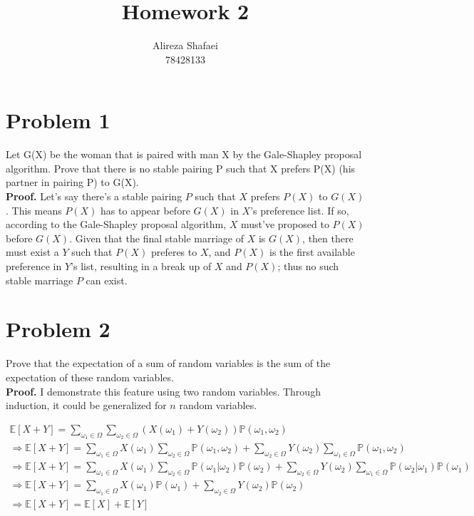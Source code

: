 \documentclass[11pt]{article} %
\title{Homework 2}
\author{Alireza Shafaei\\78428133}
\begin{document}
\maketitle

\section*{Problem 1}
Let G(X) be the woman that is paired with man X by the Gale-Shapley proposal algorithm. Prove that there is no stable pairing P such that X prefers P(X) (his partner in pairing P) to G(X).\\
\textbf{Proof.}
Let's say there's a stable pairing $P$ such that $X$ prefers $P(X)$ to $G(X)$. This means $P(X)$ has to appear before $G(X)$ in $X$'s preference list. If so, according to the Gale-Shapley proposal algorithm, $X$ must've proposed to $P(X)$ before $G(X)$. Given that the final stable marriage of $X$ is $G(X)$, then there must exist a $Y$ such that $P(X)$ preferes to $X$, and $P(X)$ is the first available preference in $Y$'s list, resulting in a break up of $X$ and $P(X)$; thus no such stable marriage $P$ can exist.

\section*{Problem 2}
Prove that the expectation of a sum of random variables is the sum of the expectation of these random variables.\\
\textbf{Proof.} I demonstrate this feature using two random variables. Through induction, it could be generalized for $n$ random variables.

\begin{gather}
\mathbb{E}[X+Y] = \sum_{\omega_1 \in \Omega} \sum_{\omega_2 \in \Omega} (X(\omega_1)+Y(\omega_2))\mathbb{P}(\omega_1,\omega_2) \\
\Rightarrow \mathbb{E}[X+Y] = 	\sum_{\omega_1 \in \Omega}X(\omega_1) \sum_{\omega_2 \in \Omega}\mathbb{P}(\omega_1,\omega_2) +
					\sum_{\omega_2 \in \Omega}Y(\omega_2) \sum_{\omega_1 \in \Omega}\mathbb{P}(\omega_1,\omega_2) \\
\Rightarrow \mathbb{E}[X+Y] = 	\sum_{\omega_1 \in \Omega}X(\omega_1) \sum_{\omega_2 \in \Omega}\mathbb{P}(\omega_1|\omega_2)\mathbb{P}(\omega_2) +
					\sum_{\omega_2 \in \Omega}Y(\omega_2) \sum_{\omega_1 \in \Omega}\mathbb{P}(\omega_2|\omega_1)\mathbb{P}(\omega_1)\\
\Rightarrow \mathbb{E}[X+Y] = 	\sum_{\omega_1 \in \Omega}X(\omega_1) \mathbb{P}(\omega_1)+
					\sum_{\omega_2 \in \Omega}Y(\omega_2) \mathbb{P}(\omega_2)\\
\Rightarrow \mathbb{E}[X+Y] = 	\mathbb{E}[X]+\mathbb{E}[Y]
\end{gather}
\end{document}
